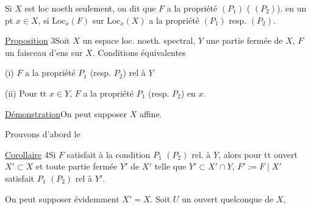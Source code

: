 
Si $X$ est loc noeth  seulement, on dit que $F$ a la propriété $(P_1)$ ( $(P_2)$). en un pt $x\in X$, si $\mathrm{Loc}_x(F)$ sur $\mathrm{Loc}_x(X)$ a la propriété $(P_1)$ resp. $(P_2)$.

\uline{Proposition} 3\quad Soit $X$ un espace loc. noeth. spectral, $Y$ une partie fermée de $X$, $F$ un faisceau d'ens sur $X$. Conditions équivalentes

(i) $F$ a la propriété $P_1$ (resp. $P_2$) rel à $Y$

(ii) Pour tt $x\in Y$, $F$ a la propriété $P_1$ (resp. $P_2$) en $x$.

\uline{Démonstration}\quad On peut supposer $X$ affine.

 Prouvons d'abord le

\uline{Corollaire} 4\quad Si $F$ satisfait à la condition $P_1$ $(P_2)$ rel. à $Y$, alors pour tt ouvert $X'\subset X$ et toute partie fermée $Y'$ de $X'$ telle que $Y'\subset X'\cap Y$, $F':=F\mid X'$ satisfait $P_1$ $(P_2)$ rel à $Y'$.


 On peut supposer évidemment $X'=X$. Soit $U$ un ouvert quelconque de $X$,


